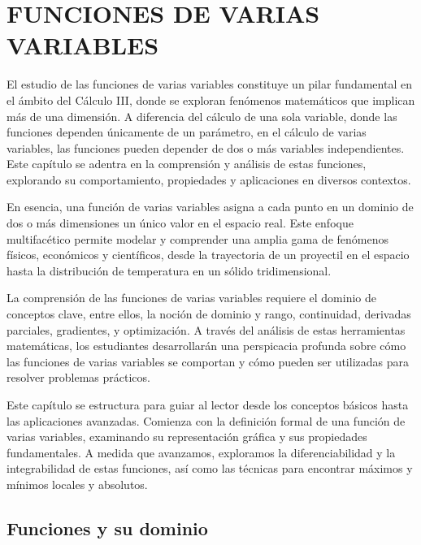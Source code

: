 \chapter{FUNCIONES DE VARIAS VARIABLES}
\printchaptertableofcontents

El estudio de las funciones de varias variables constituye un pilar fundamental en el ámbito del Cálculo III, donde se exploran fenómenos matemáticos que implican más de una dimensión. A diferencia del cálculo de una sola variable, donde las funciones dependen únicamente de un parámetro, en el cálculo de varias variables, las funciones pueden depender de dos o más variables independientes. Este capítulo se adentra en la comprensión y análisis de estas funciones, explorando su comportamiento, propiedades y aplicaciones en diversos contextos.

En esencia, una función de varias variables asigna a cada punto en un dominio de dos o más dimensiones un único valor en el espacio real. Este enfoque multifacético permite modelar y comprender una amplia gama de fenómenos físicos, económicos y científicos, desde la trayectoria de un proyectil en el espacio hasta la distribución de temperatura en un sólido tridimensional.

La comprensión de las funciones de varias variables requiere el dominio de conceptos clave, entre ellos, la noción de dominio y rango, continuidad, derivadas parciales, gradientes, y optimización. A través del análisis de estas herramientas matemáticas, los estudiantes desarrollarán una perspicacia profunda sobre cómo las funciones de varias variables se comportan y cómo pueden ser utilizadas para resolver problemas prácticos.

Este capítulo se estructura para guiar al lector desde los conceptos básicos hasta las aplicaciones avanzadas. Comienza con la definición formal de una función de varias variables, examinando su representación gráfica y sus propiedades fundamentales. A medida que avanzamos, exploramos la diferenciabilidad y la integrabilidad de estas funciones, así como las técnicas para encontrar máximos y mínimos locales y absolutos.


\section{Funciones y su dominio}

